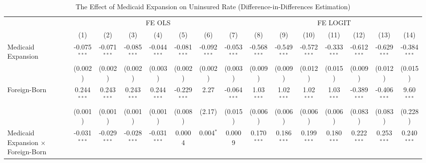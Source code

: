 \documentclass[
]{article}
\begin{document}
\begin{table}[htbp]
   \centering
   \begin{adjustbox}{width = 1.5\textwidth, center}
      \begin{threeparttable}[b]
         \caption{The Effect of Medicaid Expansion on Uninsured Rate (Difference-in-Differences Estimation)}
         \renewcommand*{\arraystretch}{1.5}
         \begin{tabular}{lcccccccccccccc}
            \tabularnewline \midrule \midrule
             & \multicolumn{7}{c}{FE OLS} & \multicolumn{7}{c}{FE LOGIT} \\ \cmidrule(lr){2-8} \cmidrule(lr){9-15}
                                                      & (1)            & (2)            & (3)            & (4)            & (5)            & (6)            & (7)            & (8)            & (9)            & (10)           & (11)           & (12)           & (13)           & (14)\\  
            \midrule 
            Medicaid Expansion                        & -0.075$^{***}$ & -0.071$^{***}$ & -0.085$^{***}$ & -0.044$^{***}$ & -0.081$^{***}$ & -0.092$^{***}$ & -0.053$^{***}$ & -0.568$^{***}$ & -0.549$^{***}$ & -0.572$^{***}$ & -0.333$^{***}$ & -0.612$^{***}$ & -0.629$^{***}$ & -0.384$^{***}$\\   
                                                      & (0.002)        & (0.002)        & (0.002)        & (0.003)        & (0.002)        & (0.002)        & (0.003)        & (0.009)        & (0.009)        & (0.012)        & (0.015)        & (0.009)        & (0.012)        & (0.015)\\   
            Foreign-Born                              & 0.244$^{***}$  & 0.243$^{***}$  & 0.243$^{***}$  & 0.244$^{***}$  & -0.229$^{***}$ & 2.27           & -0.064$^{***}$ & 1.03$^{***}$   & 1.02$^{***}$   & 1.02$^{***}$   & 1.03$^{***}$   & -0.389$^{***}$ & -0.406$^{***}$ & 9.60$^{***}$\\   
                                                      & (0.001)        & (0.001)        & (0.001)        & (0.001)        & (0.008)        & (2.17)         & (0.015)        & (0.006)        & (0.006)        & (0.006)        & (0.006)        & (0.083)        & (0.083)        & (0.228)\\   
            Medicaid Expansion $\times$ Foreign-Born  & -0.031$^{***}$ & -0.029$^{***}$ & -0.028$^{***}$ & -0.031$^{***}$ & 0.0004         & 0.004$^{*}$    & 0.0009         & 0.170$^{***}$  & 0.186$^{***}$  & 0.199$^{***}$  & 0.180$^{***}$  & 0.222$^{***}$  & 0.253$^{***}$  & 0.240$^{***}$\\   

\end{tabular}
\end{threeparttable}
\end{adjustbox}
\end{table}
\end{document}
